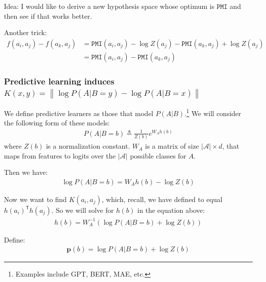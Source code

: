\documentclass{article}
\theoremstyle{plain}
\theoremstyle{definition}
\theoremstyle{remark}
\newcommand{\norm}[1]{\left\lVert#1\right\rVert}
\newcommand{\transpose}{\mathsf{T}}
\begin{document}
Idea: I would like to derive a new hypothesis space whose optimum is $\texttt{PMI}$ and then see if that works better.

Another trick:
\begin{align}
    f(a_i, a_j) - f(a_k, a_j) &= \texttt{PMI}(a_i,a_j) - \log Z(a_j) - \texttt{PMI}(a_k,a_j) + \log Z(a_j)\\
    &= \texttt{PMI}(a_i,a_j) - \texttt{PMI}(a_k,a_j)
\end{align}



\subsubsection{Predictive learning induces $K(x,y) = \norm{\log P(A|B=y) - \log P(A|B=x)}$}

We define predictive learners as those that model $P(A | B)$.\footnote{Examples include GPT, BERT, MAE, etc.} We will consider the following form of these models:
\begin{align}
    P(A | B = b) \triangleq \frac{1}{Z(b)}e^{W_A h(b)}
\end{align}
where $Z(b)$ is a normalization constant. $W_A$ is a matrix of size $|\mathcal{A}| \times d$, that maps from features to logits over the $|\mathcal{A}|$ possible classes for $A$.

Then we have:
\begin{align}
    \log P(A | B = b) = W_A h(b) - \log Z(b)
\end{align}

Now we want to find $K(a_i,a_j)$, which, recall, we have defined to equal $h(a_i)^\transpose h(a_j)$. So we will solve for $h(b)$ in the equation above:
\begin{align}
    h(b) = W_A^{-1} (\log P(A | B = b) + \log Z(b))
\end{align}

Define:
\begin{align}
    \mathbf{p}(b) = \log P(A | B = b) + \log Z(b)
\end{align}
\end{document}
